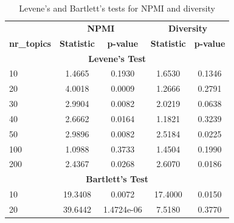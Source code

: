 \begin{table}[htbp]
    \centering
    \caption{Levene's and Bartlett's tests for NPMI and diversity}
    \begin{tabular}{@{}lcc|cc@{}}
        \toprule
                            & \multicolumn{2}{c}{\textbf{NPMI}} & \multicolumn{2}{c}{\textbf{Diversity}}                                         \\ \cmidrule(lr){2-3} \cmidrule(lr){4-5}
        \textbf{nr\_topics} & \textbf{Statistic}                & \textbf{p-value}                       & \textbf{Statistic} & \textbf{p-value} \\ \midrule
        \multicolumn{5}{c}{\textbf{Levene's Test}}                                                                                               \\ \midrule
        10                  & 1.4665                            & 0.1930                                 & 1.6530             & 0.1346           \\
        20                  & 4.0018                            & 0.0009                                 & 1.2666             & 0.2791           \\
        30                  & 2.9904                            & 0.0082                                 & 2.0219             & 0.0638           \\
        40                  & 2.6662                            & 0.0164                                 & 1.1821             & 0.3239           \\
        50                  & 2.9896                            & 0.0082                                 & 2.5184             & 0.0225           \\
        100                 & 1.0988                            & 0.3733                                 & 1.4504             & 0.1990           \\
        200                 & 2.4367                            & 0.0268                                 & 2.6070             & 0.0186           \\ \midrule
        \multicolumn{5}{c}{\textbf{Bartlett's Test}}                                                                                             \\ \midrule
        10                  & 19.3408                           & 0.0072                                 & 17.4000            & 0.0150           \\
        20                  & 39.6442                           & 1.4724e-06                             & 7.5180             & 0.3770           \\

\end{tabular}
\end{table}
